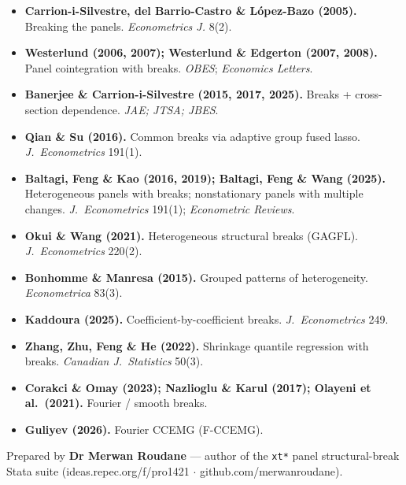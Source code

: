 \documentclass[11pt,a4paper]{article}
\begin{document}
\begin{itemize}[leftmargin=1.2em,itemsep=1pt]
 \item \textbf{Carrion-i-Silvestre, del Barrio-Castro \& L\'opez-Bazo (2005).} Breaking the panels. \emph{Econometrics J.} 8(2).
 \item \textbf{Westerlund (2006, 2007); Westerlund \& Edgerton (2007, 2008).} Panel cointegration with breaks. \emph{OBES}; \emph{Economics Letters}.
 \item \textbf{Banerjee \& Carrion-i-Silvestre (2015, 2017, 2025).} Breaks + cross-section dependence. \emph{JAE; JTSA; JBES}.
 \item \textbf{Qian \& Su (2016).} Common breaks via adaptive group fused lasso. \emph{J.\ Econometrics} 191(1).
 \item \textbf{Baltagi, Feng \& Kao (2016, 2019); Baltagi, Feng \& Wang (2025).} Heterogeneous panels with breaks; nonstationary panels with multiple changes. \emph{J.\ Econometrics} 191(1); \emph{Econometric Reviews}.
 \item \textbf{Okui \& Wang (2021).} Heterogeneous structural breaks (GAGFL). \emph{J.\ Econometrics} 220(2).
 \item \textbf{Bonhomme \& Manresa (2015).} Grouped patterns of heterogeneity. \emph{Econometrica} 83(3).
 \item \textbf{Kaddoura (2025).} Coefficient-by-coefficient breaks. \emph{J.\ Econometrics} 249.
 \item \textbf{Zhang, Zhu, Feng \& He (2022).} Shrinkage quantile regression with breaks. \emph{Canadian J.\ Statistics} 50(3).
 \item \textbf{Corakci \& Omay (2023); Nazlioglu \& Karul (2017); Olayeni et al.\ (2021).} Fourier / smooth breaks.
 \item \textbf{Guliyev (2026).} Fourier CCEMG (F-CCEMG).
\end{itemize}

\vfill
\begin{center}\small\color{cgray}
Prepared by \textbf{\color{cgrape}Dr Merwan Roudane} --- author of the \texttt{xt*} panel
structural-break Stata suite (ideas.repec.org/f/pro1421 $\cdot$ github.com/merwanroudane).
\end{center}
\end{document}
